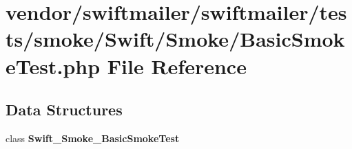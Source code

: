 \section{vendor/swiftmailer/swiftmailer/tests/smoke/\+Swift/\+Smoke/\+Basic\+Smoke\+Test.php File Reference}
\label{_basic_smoke_test_8php}
\subsection*{Data Structures}
\begin{DoxyCompactItemize}
\item 
class {\bf Swift\+\_\+\+Smoke\+\_\+\+Basic\+Smoke\+Test}
\end{DoxyCompactItemize}
